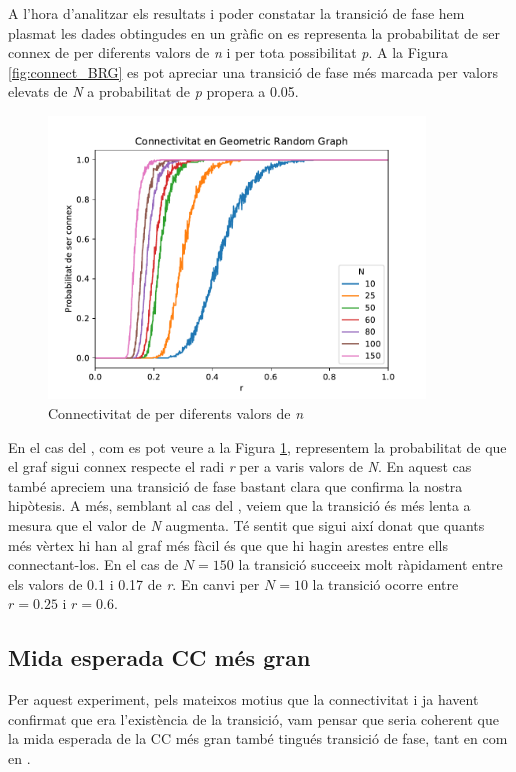 A l'hora d'analitzar els resultats i poder constatar la transició de fase hem plasmat les dades obtingudes en un gràfic on es representa la probabilitat de ser connex de \BRG per diferents valors de \textit{n} i per tota possibilitat \textit{p}. A la Figura \ref{fig:connect_BRG} es pot apreciar una transició de fase més marcada per valors elevats de \emph{N} a probabilitat de \textit{p} propera a 0.05.


\begin{figure}[H]
    \centering
    \includegraphics[width=10cm]{plots/GRG_esConnex.pdf}
    \caption{Connectivitat de \RGG per diferents valors de \textit{n}}
    \label{fig:connect_RRG}
\end{figure}

En el cas del \RGG, com es pot veure a la Figura \ref{fig:connect_RRG}, representem la probabilitat de que el graf sigui connex respecte el radi \emph{r} per a varis valors de \emph{N}. En aquest cas també apreciem una transició de fase bastant clara que confirma la nostra hipòtesis. A més, semblant al cas del \BRG, veiem que la transició és més lenta a mesura que el valor de \emph{N} augmenta. Té sentit que sigui així donat que quants més vèrtex hi han al graf més fàcil és que que hi hagin arestes entre ells connectant-los. En el cas de $N=150$ la transició succeeix molt ràpidament entre els valors de 0.1 i 0.17 de \emph{r}. En canvi per $N=10$ la transició ocorre entre $r=0.25$ i $r=0.6$.


\subsection{Mida esperada CC més gran}
Per aquest experiment, pels mateixos motius que la connectivitat i ja havent confirmat que era l'existència de la transició, vam pensar que seria coherent que la mida esperada de la CC més gran també tingués transició de fase, tant en \BRG com en \RGG.

